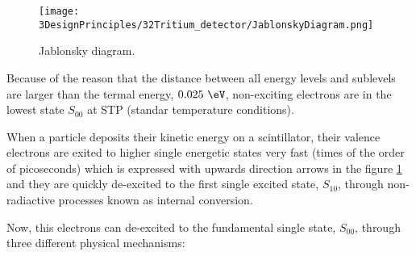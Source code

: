 \begin{figure}[htbp]
\centering
\texttt{[image: 3DesignPrinciples/32Tritium\_detector/JablonskyDiagram.png]}
\caption{Jablonsky diagram.\label{fig:JablonskyDiagram}~\cite{Knoll}}
\end{figure}

Because of the reason that the distance between all energy levels and sublevels are larger than the termal energy, $0.025~\eV$, non-exciting electrons are in the lowest state $S_{00}$ at STP (standar temperature conditions).

When a particle deposits their kinetic energy on a scintillator, their valence electrons are exited to higher single energetic states very fast (times of the order of picoseconds) which is expressed with upwards direction arrows in the figure \ref{fig:JablonskyDiagram} and they are quickly de-excited to the first single excited state, $S_{10}$, through non-radiactive processes known as internal conversion.

Now, this electrons can de-excited to the fundamental single state, $S_{00}$, through three different physical mechanisms:

